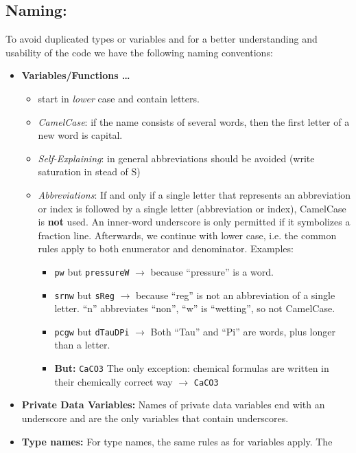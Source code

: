 \subsection{Naming:}
To avoid duplicated types or variables and for a better understanding and usability
of the code we have the following naming conventions:
\begin{itemize}
\item \textbf{Variables/Functions \ldots}
  \begin{itemize}
  \item start in \emph{lower} case and contain letters.
  \item \emph{CamelCase}: if the name consists of  several words, then
        the first letter of a new word is capital.
  \item \emph{Self-Explaining}: in general abbreviations should be avoided (write saturation in stead of S)
  \item \emph{Abbreviations}: If and only if a single letter that represents an
         abbreviation or index is followed by a single letter (abbreviation or index),
         CamelCase is \textbf{not} used. An inner-word underscore is only permitted if
         it symbolizes a fraction line. Afterwards, we continue with lower case, i.e.
         the common rules apply to both enumerator and denominator. Examples:
  \begin{itemize}
      \item \texttt{pw} but \texttt{pressureW} $\rightarrow$ because ``pressure'' is a word.
      \item \texttt{srnw} but \texttt{sReg} $\rightarrow$ because ``reg'' is not an
            abbreviation of a single letter. ``n'' abbreviates ``non'',
             ``w'' is ``wetting'', so not CamelCase.
      \item \texttt{pcgw} but \texttt{dTauDPi} $\rightarrow$ Both ``Tau'' and ``Pi''
            are words, plus longer than a letter.
      \item \textbf{But:} \texttt{CaCO3} The only exception: chemical formulas are
            written in their chemically correct way $\rightarrow$ \texttt{CaCO3}
  \end{itemize}
  \end{itemize}
\item \textbf{Private Data Variables:} Names of private data variables end with an
      underscore and are the only variables that contain underscores.
\item \textbf{Type names:} For type names, the same rules as for variables apply. The

\end{itemize}
